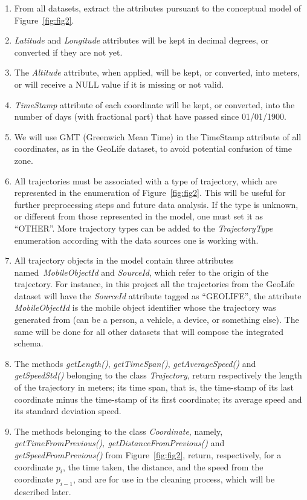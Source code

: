 \documentclass[a4paper,12pt]{article}
\begin{document}
\begin{enumerate}
	\item From all datasets, extract the attributes pursuant to the conceptual model of Figure~\ref{fig:fig2}.
	
	\item \textit{Latitude} and \textit{Longitude} attributes will be kept in decimal degrees, or converted if they are not yet.
	
	\item The \textit{Altitude} attribute, when applied, will be kept, or converted, into meters, or will receive a NULL value if it is missing or not valid.
	
	\item \textit{TimeStamp} attribute of each coordinate will be kept, or converted, into the number of days (with fractional part) that have passed since 01/01/1900.
	
	\item We will use GMT (Greenwich Mean Time) in the TimeStamp attribute of all coordinates, as in the GeoLife dataset, to avoid potential confusion of time zone.
	
	\item  All trajectories must be associated with a type of trajectory, which are represented in the enumeration of Figure~\ref{fig:fig2}. This will be useful for further preprocessing steps and future data analysis. If the type is unknown, or different from those represented in the model, one must set it as ``OTHER''. More trajectory types can be added to the \textit{TrajectoryType} enumeration according with the data sources one is working with. 
	
	\item  All trajectory objects in the model contain three attributes named~\textit{MobileObjectId} and \textit{SourceId}, which refer to the origin of the trajectory. For instance, in this project all the trajectories from the GeoLife dataset will have the \textit{SourceId} attribute tagged as ``GEOLIFE'', the attribute \textit{MobileObjectId} is the mobile object identifier whose the trajectory was generated from (can be a person, a vehicle, a device, or something else). The same will be done for all other datasets that will compose the integrated schema.
	
	\item The methods \textit{getLength()}, \textit{getTimeSpan()}, \textit{getAverageSpeed()} and \textit{getSpeedStd()} belonging to the class \textit{Trajectory}, return respectively the length of the trajectory in meters; its time span, that is, the time-stamp of its last coordinate minus the time-stamp of its first coordinate; its average speed and its standard deviation speed.
	
	\item The methods belonging to the class \textit{Coordinate}, namely, \textit{getTimeFromPrevious(), getDistanceFromPrevious()} and \textit{getSpeedFromPrevious()} from Figure~\ref{fig:fig2}, return, respectively, for a coordinate $p_i$, the time taken, the distance, and the speed from the coordinate $p_{i-1}$, and are for use in the cleaning process, which will be described later.
\end{enumerate}
\end{document}
